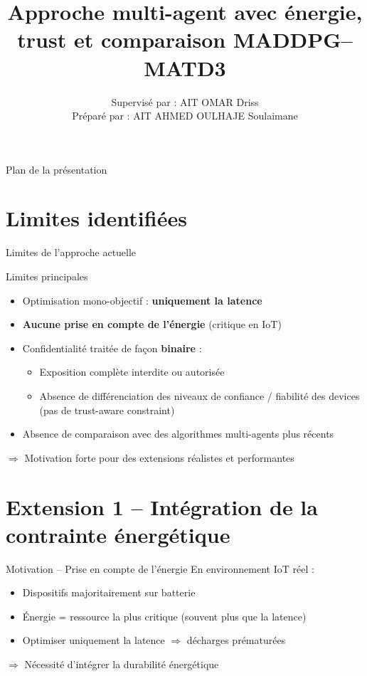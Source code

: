 \documentclass[aspectratio=169]{beamer}
\title{Approche multi-agent avec énergie, trust et comparaison MADDPG–MATD3}
\author{Supervisé par : AIT OMAR Driss\\
            Préparé par : AIT AHMED OULHAJE Soulaimane}
\institute{Master AIDC — FST Béni Mellal}
\begin{document}
\begin{frame}
  \titlepage
\end{frame}

\begin{frame}{Plan de la présentation}
\tableofcontents[hideallsubsections]
\end{frame}

\section{Limites identifiées}

\begin{frame}{Limites de l'approche actuelle}
\begin{block}{Limites principales}
\begin{itemize}
    \item Optimisation mono-objectif : \textbf{uniquement la latence}
    \item \textbf{Aucune prise en compte de l'énergie} (critique en IoT)
    \item Confidentialité traitée de façon \textbf{binaire} : 
      \begin{itemize}
          \item Exposition complète interdite ou autorisée
          \item Absence de différenciation des niveaux de confiance / fiabilité des devices (pas de trust-aware constraint)
      \end{itemize}
    \item Absence de comparaison avec des algorithmes multi-agents plus récents
\end{itemize}
\end{block}

 \bigskip
$\Rightarrow$ Motivation forte pour des extensions réalistes et performantes
\end{frame}

\section{Extension 1 – Intégration de la contrainte énergétique}

\begin{frame}{Motivation – Prise en compte de l'énergie}
En environnement IoT réel :

\begin{itemize}
    \item Dispositifs majoritairement sur batterie
    \item Énergie = ressource la plus critique (souvent plus que la latence)
    \item Optimiser uniquement la latence $\Rightarrow$ décharges prématurées
\end{itemize}

$\Rightarrow$ Nécessité d'intégrer la durabilité énergétique
\end{frame}
\end{document}
